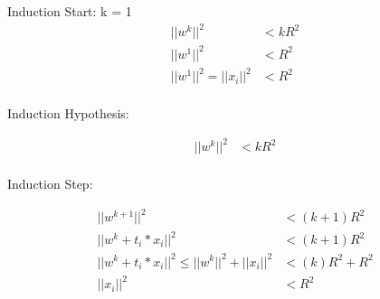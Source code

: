 Induction Start:
k = 1 \\

\begin{align*}
	||w^k||^2 &< kR^2 \\
	||w^1||^2 &< R^2 \\ 
	||w^1||^2=||x_i||^2 &< R^2 \\
\end{align*}

Induction Hypothesis:

\begin{align*}
||w^k||^2 &< kR^2 \\
\end{align*}

Induction Step:

\begin{align*}
||w^{k+1}||^2 &< (k+1)R^2 \\
||w^{k}+t_i*x_i||^2 &< (k+1)R^2 \\
||w^{k}+t_i*x_i||^2 \leq ||w^{k}||^2+||x_i||^2 &< (k)R^2 + R^2 \\
||x_i||^2 &< R^2 \\
\end{align*}